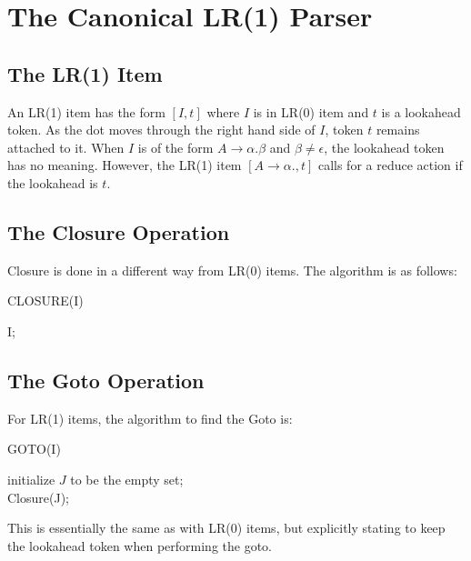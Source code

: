 \documentclass[12pt,letterpaper]{amsbook}
\theoremstyle{definition}
\begin{document}
\section{The Canonical LR(1) Parser}

\subsection{The LR(1) Item}

An LR(1) item has the form $[I,t]$ where $I$ is in LR(0) item and $t$ is a lookahead token. As the dot moves through the right hand side of $I$, token $t$ remains attached to it. When $I$ is of the form $A \rightarrow \alpha . \beta$ and $\beta \neq \epsilon$, the lookahead token has no meaning. However, the LR(1) item $[A \rightarrow \alpha ., t]$ calls for a reduce action if the lookahead is $t$.

\subsection{The Closure Operation}

Closure is done in a different way from LR(0) items. The algorithm is as follows:

\begin{algorithm}[H]
  \SetAlgoLined
  \caption{CLOSURE(I)}
   {
  }
  \Return I;
\end{algorithm}

\subsection{The Goto Operation}

For LR(1) items, the algorithm to find the Goto is:

\begin{algorithm}[H]
  \SetAlgoLined
  \caption{GOTO(I)}
  initialize $J$ to be the empty set; \\
  \Return Closure(J);
\end{algorithm}

This is essentially the same as with LR(0) items, but explicitly stating to keep the lookahead token when performing the goto.
\end{document}
